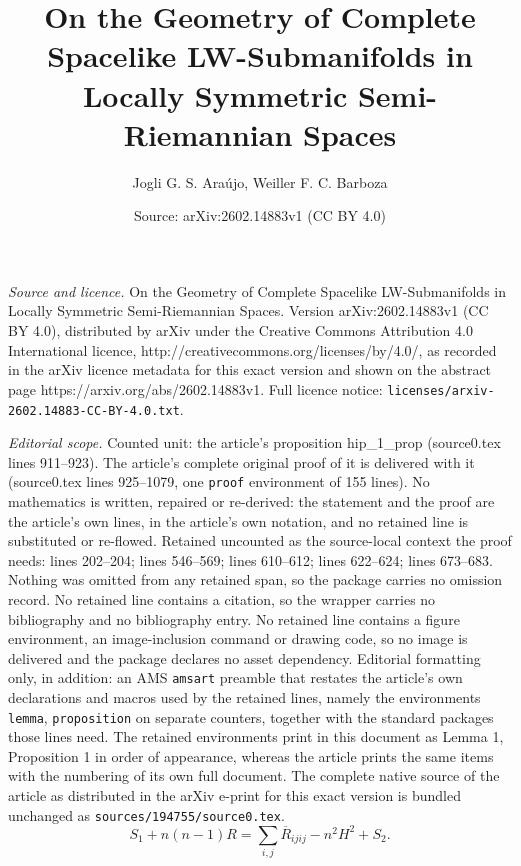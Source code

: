 \documentclass[10pt,a4paper]{amsart}
\title{On the Geometry of Complete Spacelike LW-Submanifolds in Locally Symmetric Semi-Riemannian Spaces}
\author{Jogli G. S. Ara\'ujo, Weiller F. C. Barboza}
\date{Source: arXiv:2602.14883v1 (CC BY 4.0)}
\begin{document}
\maketitle

\noindent\emph{Source and licence.} On the Geometry of Complete Spacelike LW-Submanifolds in Locally Symmetric Semi-Riemannian Spaces. Version arXiv:2602.14883v1 (CC BY 4.0), distributed by arXiv under the Creative Commons Attribution 4.0 International licence, http://creativecommons.org/licenses/by/4.0/, as recorded in the arXiv licence metadata for this exact version and shown on the abstract page https://arxiv.org/abs/2602.14883v1. Full licence notice: \texttt{licenses/arxiv-2602.14883-CC-BY-4.0.txt}.\par\smallskip

\noindent\textit{Editorial scope.} Counted unit: the article's proposition hip\_1\_prop (source0.tex lines 911--923). The article's complete original proof of it is delivered with it (source0.tex lines 925--1079, one \texttt{proof} environment of 155 lines). No mathematics is written, repaired or re-derived: the statement and the proof are the article's own lines, in the article's own notation, and no retained line is substituted or re-flowed.  Retained uncounted as the source-local context the proof needs: lines 202--204; lines 546--569; lines 610--612; lines 622--624; lines 673--683.  Nothing was omitted from any retained span, so the package carries no omission record.  No retained line contains a citation, so the wrapper carries no bibliography and no bibliography entry.  No retained line contains a figure environment, an image-inclusion command or drawing code, so no image is delivered and the package declares no asset dependency.  Editorial formatting only, in addition: an AMS \texttt{amsart} preamble that restates the article's own declarations and macros used by the retained lines, namely the environments \texttt{lemma}, \texttt{proposition} on separate counters, together with the standard packages those lines need.  The retained environments print in this document as Lemma 1, Proposition 1 in order of appearance, whereas the article prints the same items with the numbering of its own full document.  The complete native source of the article as distributed in the arXiv e-print for this exact version is bundled unchanged as \texttt{sources/194755/source0.tex}.
\begin{equation}\label{equacaoRS}
S_1 + n(n-1)R = \sum_{i,j} \overline{R}_{ijij} - n^2H^2 + S_2.
\end{equation}
\end{document}
